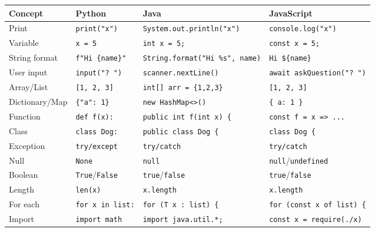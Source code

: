 \documentclass[
  justified,
  openright,
]{tufte-book}
\begin{document}
\begin{fullwidth}{\def\LTcaptype{none} %
\begin{longtable}[]{@{}
  >{\raggedright\arraybackslash}p{}
  >{\raggedright\arraybackslash}p{}
  >{\raggedright\arraybackslash}p{}
  >{\raggedright\arraybackslash}p{}@{}}
\toprule\noalign{}
\begin{minipage}[b]{\linewidth}\raggedright
Concept
\end{minipage} & \begin{minipage}[b]{\linewidth}\raggedright
Python
\end{minipage} & \begin{minipage}[b]{\linewidth}\raggedright
Java
\end{minipage} & \begin{minipage}[b]{\linewidth}\raggedright
JavaScript
\end{minipage} \\
\midrule\noalign{}
\endhead
\bottomrule\noalign{}
\endlastfoot
Print & \texttt{print("x")} & \texttt{System.out.println("x")} &
\texttt{console.log("x")} \\
Variable & \texttt{x\ =\ 5} & \texttt{int\ x\ =\ 5;} &
\texttt{const\ x\ =\ 5;} \\
String format & \texttt{f"Hi\ \{name\}"} &
\texttt{String.format("Hi\ \%s",\ name)} &
\texttt{\textasciigrave{}Hi\ \$\{name\}\textasciigrave{}} \\
User input & \texttt{input("?\ ")} & \texttt{scanner.nextLine()} &
\texttt{await\ askQuestion("?\ ")} \\
Array/List & \texttt{{[}1,\ 2,\ 3{]}} &
\texttt{int{[}{]}\ arr\ =\ \{1,2,3\}} & \texttt{{[}1,\ 2,\ 3{]}} \\
Dictionary/Map & \texttt{\{"a":\ 1\}} &
\texttt{new\ HashMap\textless{}\textgreater{}()} &
\texttt{\{\ a:\ 1\ \}} \\
Function & \texttt{def\ f(x):} & \texttt{public\ int\ f(int\ x)\ \{} &
\texttt{const\ f\ =\ x\ =\textgreater{}\ ...} \\
Class & \texttt{class\ Dog:} & \texttt{public\ class\ Dog\ \{} &
\texttt{class\ Dog\ \{} \\
Exception & \texttt{try/except} & \texttt{try/catch} &
\texttt{try/catch} \\
Null & \texttt{None} & \texttt{null} &
\texttt{null}/\texttt{undefined} \\
Boolean & \texttt{True}/\texttt{False} & \texttt{true}/\texttt{false} &
\texttt{true}/\texttt{false} \\
Length & \texttt{len(x)} & \texttt{x.length} & \texttt{x.length} \\
For each & \texttt{for\ x\ in\ list:} &
\texttt{for\ (T\ x\ :\ list)\ \{} &
\texttt{for\ (const\ x\ of\ list)\ \{} \\
Import & \texttt{import\ math} & \texttt{import\ java.util.*;} &
\texttt{const\ x\ =\ require(\textquotesingle{}./x\textquotesingle{})} \\
\end{longtable}
}
\end{fullwidth}
\end{document}
